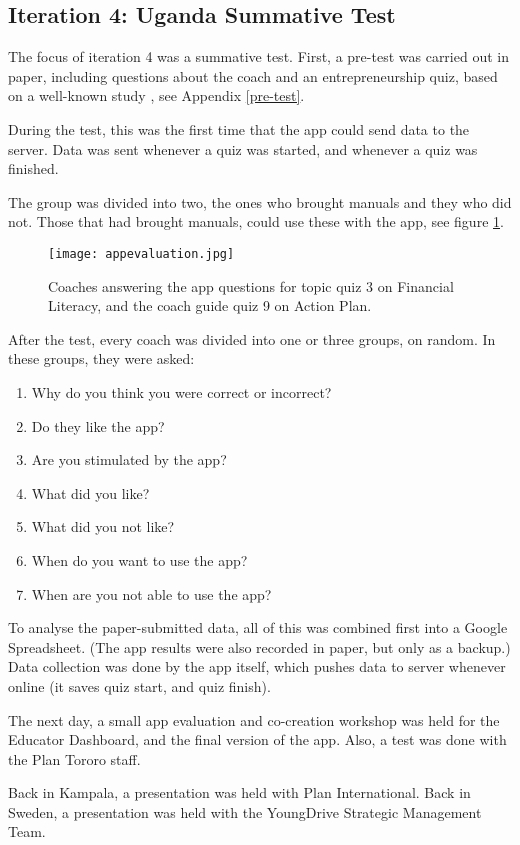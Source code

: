 \subsection{Iteration 4: Uganda Summative Test}

The focus of iteration 4 was a summative test. First, a pre-test was carried out in paper, including questions about the coach and an entrepreneurship quiz, based on a well-known study \citep{general-entrepreneurship-quiz}, see Appendix \ref{pre-test}.

During the test, this was the first time that the app could send data to the server. Data was sent whenever a quiz was started, and whenever a quiz was finished.

The group was divided into two, the ones who brought manuals and they who did not. Those that had brought manuals, could use these with the app, see figure \ref{fig:appevaluation}.

\begin{figure}[h]
    \centering
    \texttt{[image: appevaluation.jpg]}
    \caption{Coaches answering the app questions for topic quiz 3 on Financial Literacy, and the coach guide quiz 9 on Action Plan.}
    \label{fig:appevaluation}
\end{figure}

After the test, every coach was divided into one or three groups, on random. In these groups, they were asked:

\begin{enumerate}
\item Why do you think you were correct or incorrect?
\item Do they like the app?
\item Are you stimulated by the app?
\item What did you like?
\item What did you not like?
\item When do you want to use the app?
\item When are you not able to use the app?
\end{enumerate}

To analyse the paper-submitted data, all of this was combined first into a Google Spreadsheet. (The app results were also recorded in paper, but only as a backup.) Data collection was done by the app itself, which pushes data to server whenever online (it saves quiz start, and quiz finish).

The next day, a small app evaluation and co-creation workshop was held for the Educator Dashboard, and the final version of the app. Also, a test was done with the Plan Tororo staff.

Back in Kampala, a presentation was held with Plan International. Back in Sweden, a presentation was held with the YoungDrive Strategic Management Team.
